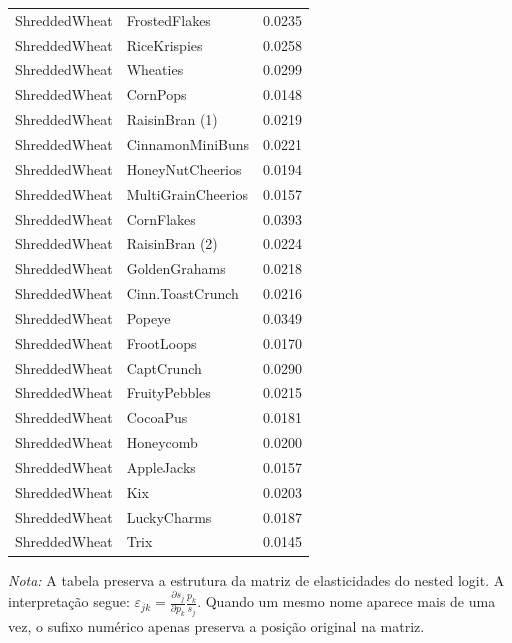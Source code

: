 \begin{table}[H]
\begin{tabular}{llr}
ShreddedWheat & FrostedFlakes & 0.0235 \\
ShreddedWheat & RiceKrispies & 0.0258 \\
ShreddedWheat & Wheaties & 0.0299 \\
ShreddedWheat & CornPops & 0.0148 \\
ShreddedWheat & RaisinBran (1) & 0.0219 \\
ShreddedWheat & CinnamonMiniBuns & 0.0221 \\
ShreddedWheat & HoneyNutCheerios & 0.0194 \\
ShreddedWheat & MultiGrainCheerios & 0.0157 \\
ShreddedWheat & CornFlakes & 0.0393 \\
ShreddedWheat & RaisinBran (2) & 0.0224 \\
ShreddedWheat & GoldenGrahams & 0.0218 \\
ShreddedWheat & Cinn.ToastCrunch & 0.0216 \\
ShreddedWheat & Popeye & 0.0349 \\
ShreddedWheat & FrootLoops & 0.0170 \\
ShreddedWheat & CaptCrunch & 0.0290 \\
ShreddedWheat & FruityPebbles & 0.0215 \\
ShreddedWheat & CocoaPus & 0.0181 \\
ShreddedWheat & Honeycomb & 0.0200 \\
ShreddedWheat & AppleJacks & 0.0157 \\
ShreddedWheat & Kix & 0.0203 \\
ShreddedWheat & LuckyCharms & 0.0187 \\
ShreddedWheat & Trix & 0.0145 \\
\bottomrule
\end{tabular}

\vspace{0.3em}
\footnotesize
\textit{Nota:} A tabela preserva a estrutura da matriz de elasticidades do nested logit. A interpretação segue: $\varepsilon_{jk}=\frac{\partial s_j}{\partial p_k}\frac{p_k}{s_j}$. Quando um mesmo nome aparece mais de uma vez, o sufixo numérico apenas preserva a posição original na matriz.
\end{table}
\endgroup


